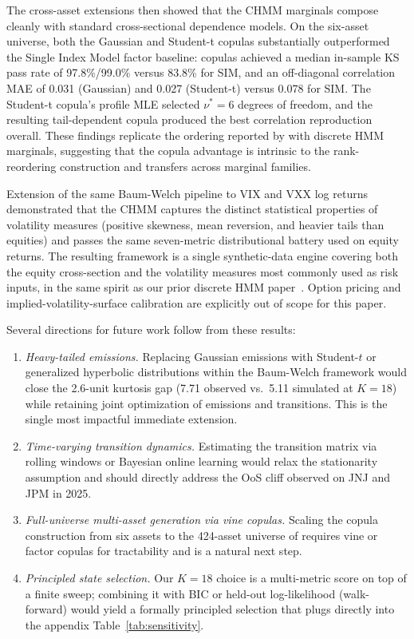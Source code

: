 The cross-asset extensions then showed that the CHMM marginals compose cleanly with standard cross-sectional dependence models.
On the six-asset universe, both the Gaussian and Student-t copulas substantially outperformed the Single Index Model factor baseline: copulas achieved a median in-sample KS pass rate of 97.8\%/99.0\% versus 83.8\% for SIM, and an off-diagonal correlation MAE of 0.031 (Gaussian) and 0.027 (Student-t) versus 0.078 for SIM.
The Student-t copula's profile MLE selected $\nu^* = 6$ degrees of freedom, and the resulting tail-dependent copula produced the best correlation reproduction overall.
These findings replicate the ordering reported by \citet{alswaidan2026hybrid} with discrete HMM marginals, suggesting that the copula advantage is intrinsic to the rank-reordering construction and transfers across marginal families.

Extension of the same Baum-Welch pipeline to VIX and VXX log returns demonstrated that the CHMM captures the distinct statistical properties of volatility measures (positive skewness, mean reversion, and heavier tails than equities) and passes the same seven-metric distributional battery used on equity returns.
The resulting framework is a single synthetic-data engine covering both the equity cross-section and the volatility measures most commonly used as risk inputs, in the same spirit as our prior discrete HMM paper~\citep{alswaidan2026hybrid}.
Option pricing and implied-volatility-surface calibration are explicitly out of scope for this paper.

Several directions for future work follow from these results:
\begin{enumerate}
    \item \textit{Heavy-tailed emissions.}
    Replacing Gaussian emissions with Student-$t$ or generalized hyperbolic distributions within the Baum-Welch framework would close the 2.6-unit kurtosis gap (7.71 observed vs.\ 5.11 simulated at $K = 18$) while retaining joint optimization of emissions and transitions.
    This is the single most impactful immediate extension.

    \item \textit{Time-varying transition dynamics.}
    Estimating the transition matrix via rolling windows or Bayesian online learning would relax the stationarity assumption and should directly address the OoS cliff observed on JNJ and JPM in 2025.

    \item \textit{Full-universe multi-asset generation via vine copulas.}
    Scaling the copula construction from six assets to the 424-asset universe of \citet{alswaidan2026hybrid} requires vine or factor copulas for tractability and is a natural next step.

    \item \textit{Principled state selection.}
    Our $K = 18$ choice is a multi-metric score on top of a finite sweep; combining it with BIC or held-out log-likelihood (walk-forward) would yield a formally principled selection that plugs directly into the appendix Table~\ref{tab:sensitivity}.
\end{enumerate}

